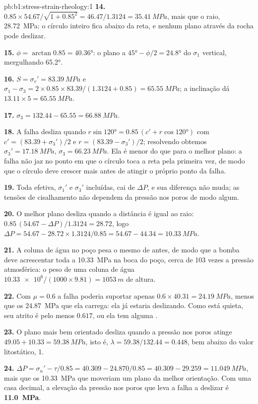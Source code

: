 \begin{solution}{pb:b1:stress-strain-rheology:1}
\textbf{14.} $0.85\times54.67/\sqrt{1 + 0.85^2} = 46.47/1.3124 =
\qty{35.41}{MPa}$, mais que o raio, \qty{28.72}{MPa}: o círculo inteiro
fica abaixo da reta, e nenhum plano através da rocha pode deslizar.

\textbf{15.} $\phi = \arctan0.85 = \ang{40.36}$: o plano a
$\ang{45} - \phi/2 = \ang{24.8}$ do $\sigma_1$ vertical, mergulhando
\ang{65.2}.

\textbf{16.} $S = \sigma_v' = \qty{83.39}{MPa}$ e
$\sigma_1 - \sigma_3 = 2\times0.85\times83.39/(1.3124 + 0.85) =
\qty{65.55}{MPa}$; a inclinação dá $13.11\times5 = \qty{65.55}{MPa}$.

\textbf{17.} $\sigma_3 = 132.44 - 65.55 = \qty{66.88}{MPa}$.

\textbf{18.} A falha desliza quando
$r\sin\ang{120} = 0.85\,(c' + r\cos\ang{120})$ com
$c' = (83.39 + \sigma_3')/2$ e $r = (83.39 - \sigma_3')/2$; resolvendo obtemos
$\sigma_3' = \qty{17.18}{MPa}$, $\sigma_3 = \qty{66.23}{MPa}$. Ela é menor
do que para o melhor plano: a falha não jaz no ponto em que o círculo toca a reta pela primeira vez, de modo que o círculo deve crescer mais antes de atingir o próprio ponto da falha.

\textbf{19.} Toda  efetiva, $\sigma_1'$ e $\sigma_3'$ incluídas, cai de $\Delta P$, e sua diferença não muda; as tensões de cisalhamento não dependem da pressão nos poros de modo algum.

\textbf{20.} O melhor plano desliza quando a distância é igual ao raio:
$0.85\,(54.67 - \Delta P)/1.3124 = 28.72$, logo
$\Delta P = 54.67 - 28.72\times1.3124/0.85 = 54.67 - 44.34 = \qty{10.33}{MPa}$.

\textbf{21.} A coluna de água no poço pesa o mesmo de antes, de modo que a
bomba deve acrescentar toda a \qty{10.33}{MPa} na boca do poço, cerca de 103 vezes
a pressão atmosférica: o peso de uma coluna de água
$\num{10.33e6}/(1000\times9.81) = \qty{1053}{m}$ de altura.

\textbf{22.} Com $\mu = 0.6$ a falha poderia suportar apenas
$0.6\times40.31 = \qty{24.19}{MPa}$, menos que os \qty{24.87}{MPa} que ela carrega: ela já estaria deslizando. Como está quieta, seu atrito é pelo menos $0.617$, ou ela tem alguma .

\textbf{23.} O plano mais bem orientado desliza quando a pressão nos poros atinge
$49.05 + 10.33 = \qty{59.38}{MPa}$, isto é, $\lambda = 59.38/132.44 = 0.448$,
bem abaixo do valor litostático, 1.

\textbf{24.} $\Delta P = \sigma_n' - \tau/0.85 = 40.309 - 24.870/0.85 = 40.309 -
29.259 = \qty{11.049}{MPa}$, mais que os \qty{10.33}{MPa} que moveriam um plano da melhor orientação. Com uma casa decimal, a elevação da pressão nos poros que leva a falha a deslizar é
\textbf{\qty[text-series-to-math=true]{11.0}{MPa}}.
\end{solution}
